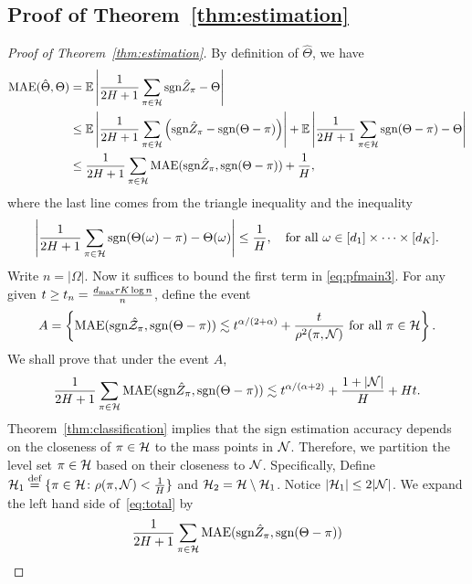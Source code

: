 \documentclass[twoside,11pt]{article}
\theoremstyle{plain}
\theoremstyle{definition}
\def\sign{\textup{sgn}}
\begin{document}
\subsection{Proof of Theorem~\ref{thm:estimation}}
\begin{proof}[Proof of Theorem~\ref{thm:estimation}]
By definition of $\hat\Theta$, we have
\begin{align}\label{eq:pfmain3}\nonumber
\text{MAE}(\hat\Theta,\Theta) &= \mathbb{E}\left|\frac{1}{2H+1}\sum_{\pi\in\tH}\sign\hat Z_\pi-\Theta\right|\\\nonumber
&\leq \mathbb{E}\left|\frac{1}{2H+1}\sum_{\pi\in\tH}\left(\sign\hat Z_\pi-\sign(\Theta-\pi)\right)\right|+\mathbb{E}\left|\frac{1}{2H+1}\sum_{\pi\in\tH}\sign(\Theta-\pi)-\Theta\right|\\&
\leq \frac{1}{2H+1}\sum_{\pi\in\tH}\text{MAE}(\sign\hat Z_\pi,\sign(\Theta-\pi))+\frac{1}{H},
\end{align}
where the last line comes  from the triangle inequality and the inequality
\begin{equation}
\left|\frac{1}{2H+1}\sum_{\pi\in\tH}\sign(\Theta(\omega)-\pi)-\Theta(\omega)\right|\leq \frac{1}{H},\quad\text{for all } \omega\in[d_1]\times\cdots\times[d_K] .
\end{equation}
Write $n=|\Omega|$. Now it suffices to bound  the first term in \eqref{eq:pfmain3}.  
For any given $t\geq t_n={d_{\max}rK\log n \over n}$, define the event
\begin{align}
A = \left\{\text{MAE}(\sign \hat \tZ_\pi,\sign(\Theta-\pi))\lesssim t^{\alpha/(2+\alpha)}+ \frac{t}{\rho^2(\pi,\tN)}\text{ for all } \pi\in\tH\right\}.
\end{align}
We shall prove that under the event $A$,
\begin{equation}\label{eq:total}
{1\over 2H+1}\sum_{\pi \in \tH} \textup{MAE}(\sign \hat Z_\pi, \sign (\Theta-\pi)) \lesssim  t^{\alpha/(\alpha+2)}+{1+|\tN|\over H}+ H t.
\end{equation}
Theorem~\ref{thm:classification} implies that the  sign estimation accuracy depends on the closeness of $\pi\in \mathcal{H}$ to the mass points in $\mathcal{N}$. Therefore, we partition the level set $\pi \in \mathcal{H}$ based on their closeness to $\mathcal{N}$. Specifically, Define $\mathcal{H}_1 \stackrel{\text{def}}{=}\{\pi\in\mathcal{H}\colon \rho(\pi,\mathcal{N})<\frac{1}{H}\}$ and $\mathcal{H}_2 = \mathcal{H}\setminus\mathcal{H}_1$.   Notice $|\mathcal{H}_1|\leq 2|\mathcal{N}|$.  We expand the left hand side of~\eqref{eq:total} by
\begin{align}\label{eq:twobounds}
&{1\over 2H+1}\sum_{\pi \in \tH} \textup{MAE}(\sign \hat Z_\pi, \sign (\Theta-\pi))\notag \\

\end{align}
\end{proof}
\end{document}

